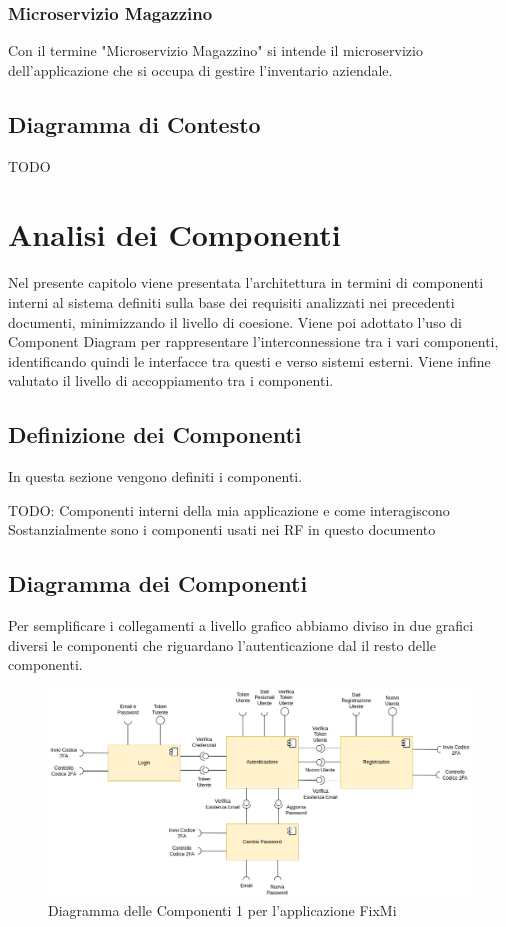 \documentclass{report}
\begin{document}
\subsection*{Microservizio Magazzino}
Con il termine "Microservizio Magazzino" si intende il microservizio dell'applicazione che si occupa di gestire l'inventario aziendale.


\section{Diagramma di Contesto}

TODO

\chapter{Analisi dei Componenti}
Nel presente capitolo viene presentata l’architettura in termini di componenti interni al sistema definiti sulla base dei requisiti analizzati nei precedenti documenti, minimizzando il livello di coesione. Viene poi adottato l’uso di Component Diagram per rappresentare l’interconnessione tra i vari componenti, identificando quindi le interfacce tra questi e verso sistemi esterni. Viene infine valutato il livello di accoppiamento tra i componenti.


\section{Definizione dei Componenti}
In questa sezione vengono definiti i componenti.


TODO: Componenti interni della mia applicazione e come interagiscono\\
Sostanzialmente sono i componenti usati nei RF in questo documento



\section{Diagramma dei Componenti}

Per semplificare i collegamenti a livello grafico abbiamo diviso in due grafici diversi le componenti che riguardano l'autenticazione dal il resto delle componenti.

\begin{figure}[H]
	\centering\includegraphics[width=1\textwidth]{images/autenticazione_diagramma_dei_componenti.png}
	Diagramma delle Componenti 1 per l'applicazione FixMi
\end{figure}
\end{document}
